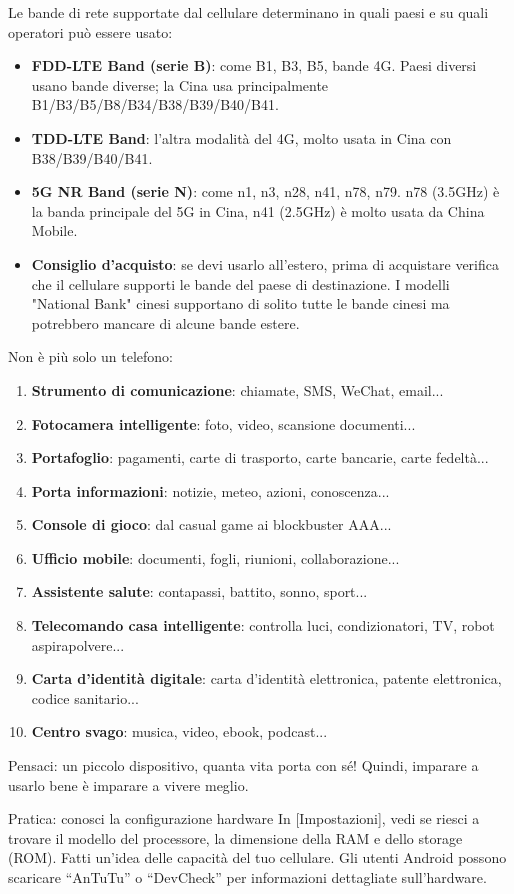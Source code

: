 Le bande di rete supportate dal cellulare determinano in quali paesi e su quali operatori può essere usato:

\begin{itemize}
  \item \textbf{FDD-LTE Band (serie B)}: come B1, B3, B5, bande 4G. Paesi diversi usano bande diverse; la Cina usa principalmente B1/B3/B5/B8/B34/B38/B39/B40/B41.
  \item \textbf{TDD-LTE Band}: l'altra modalità del 4G, molto usata in Cina con B38/B39/B40/B41.
  \item \textbf{5G NR Band (serie N)}: come n1, n3, n28, n41, n78, n79. n78 (3.5GHz) è la banda principale del 5G in Cina, n41 (2.5GHz) è molto usata da China Mobile.
  \item \textbf{Consiglio d'acquisto}: se devi usarlo all'estero, prima di acquistare verifica che il cellulare supporti le bande del paese di destinazione. I modelli "National Bank" cinesi supportano di solito tutte le bande cinesi ma potrebbero mancare di alcune bande estere.
\end{itemize}


Non è più solo un telefono:

\begin{enumerate}
  \item \textbf{Strumento di comunicazione}: chiamate, SMS, WeChat, email...
  \item \textbf{Fotocamera intelligente}: foto, video, scansione documenti...
  \item \textbf{Portafoglio}: pagamenti, carte di trasporto, carte bancarie, carte fedeltà...
  \item \textbf{Porta informazioni}: notizie, meteo, azioni, conoscenza...
  \item \textbf{Console di gioco}: dal casual game ai blockbuster AAA...
  \item \textbf{Ufficio mobile}: documenti, fogli, riunioni, collaborazione...
  \item \textbf{Assistente salute}: contapassi, battito, sonno, sport...
  \item \textbf{Telecomando casa intelligente}: controlla luci, condizionatori, TV, robot aspirapolvere...
  \item \textbf{Carta d'identità digitale}: carta d'identità elettronica, patente elettronica, codice sanitario...
  \item \textbf{Centro svago}: musica, video, ebook, podcast...
\end{enumerate}

Pensaci: un piccolo dispositivo, quanta vita porta con sé! Quindi, imparare a usarlo bene è imparare a vivere meglio.

\begin{tcbpractice}{Pratica: conosci la configurazione hardware}
In [Impostazioni], vedi se riesci a trovare il modello del processore, la dimensione della RAM e dello storage (ROM). Fatti un'idea delle capacità del tuo cellulare. Gli utenti Android possono scaricare “AnTuTu” o “DevCheck” per informazioni dettagliate sull'hardware.

\end{tcbpractice}
